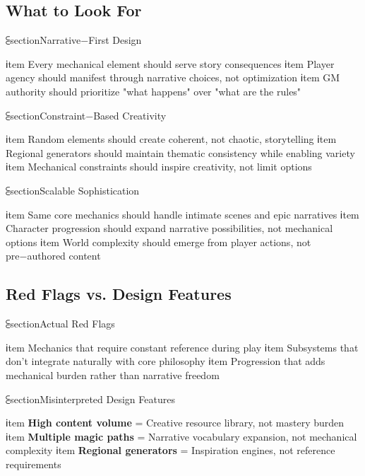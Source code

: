 \subsection{What to Look For}

⫕section{Narrative−First Design}
\begin{itemize}
    ℹtem Every mechanical element should serve story consequences
    ℹtem Player agency should manifest through narrative choices, not optimization
    ℹtem GM authority should prioritize "what happens" over "what are the rules"
\end{itemize}

⫕section{Constraint−Based Creativity}
\begin{itemize}
    ℹtem Random elements should create coherent, not chaotic, storytelling
    ℹtem Regional generators should maintain thematic consistency while enabling variety
    ℹtem Mechanical constraints should inspire creativity, not limit options
\end{itemize}

⫕section{Scalable Sophistication}
\begin{itemize}
    ℹtem Same core mechanics should handle intimate scenes and epic narratives
    ℹtem Character progression should expand narrative possibilities, not mechanical options
    ℹtem World complexity should emerge from player actions, not pre−authored content
\end{itemize}

\subsection{Red Flags vs. Design Features}

⫕section{Actual Red Flags}
\begin{itemize}
    ℹtem Mechanics that require constant reference during play
    ℹtem Subsystems that don't integrate naturally with core philosophy
    ℹtem Progression that adds mechanical burden rather than narrative freedom
\end{itemize}

⫕section{Misinterpreted Design Features}
\begin{itemize}
    ℹtem \textbf{High content volume} = Creative resource library, not mastery burden
    ℹtem \textbf{Multiple magic paths} = Narrative vocabulary expansion, not mechanical complexity
    ℹtem \textbf{Regional generators} = Inspiration engines, not reference requirements
\end{itemize}

